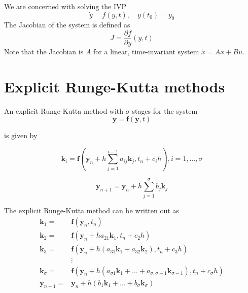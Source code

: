 We are concerned with solving the IVP
\begin{equation}
    \Dot{y} = f(y,t), \quad y(t_0) = y_0
\end{equation}
The Jacobian of the system is defined as
\begin{equation}
    J = \frac{\partial f}{\partial y}(y,t)
\end{equation}
Note that the Jacobian is $A$ for a linear, time-invariant system $\dot{x} = Ax + Bu$.

\section{Explicit Runge-Kutta methods}

An explicit Runge-Kutta method with $σ$ stages for the system
\begin{equation}
    \dot{\mathbf{y}}=\mathbf{f}(\mathbf{y}, t)
\end{equation}

is given by

\begin{equation}
    \mathbf{k}_{i}=\mathbf{f}\left(\mathbf{y}_{n}+h \sum_{j=1}^{i-1} a_{i j} \mathbf{k}_{j}, t_{n}+c_{i} h\right), i=1, \ldots, \sigma
\end{equation}

\begin{equation}
\mathbf{y}_{n+1}=\mathbf{y}_{n}+h \sum_{j=1}^{\sigma} b_{j} \mathbf{k}_{j}
\end{equation}

The explicit Runge-Kutta method can be written out as
\begin{equation}
    \begin{aligned}
        \mathbf{k}_{1}=& \mathbf{f}\left(\mathbf{y}_{n}, t_{n}\right) \\
        \mathbf{k}_{2}=& \mathbf{f}\left(\mathbf{y}_{n}+h a_{21} \mathbf{k}_{1}, t_{n}+c_{2} h\right) \\
        \mathbf{k}_{3}=& \mathbf{f}\left(\mathbf{y}_{n}+h\left(a_{31} \mathbf{k}_{1}+a_{32} \mathbf{k}_{2}\right), t_{n}+c_{3} h\right) \\
        & \vdots \\
        \mathbf{k}_{\sigma}=& \mathbf{f}\left(\mathbf{y}_{n}+h\left(a_{\sigma 1} \mathbf{k}_{1}+\ldots+a_{\sigma, \sigma-1} \mathbf{k}_{\sigma-1}\right), t_{n}+c_{\sigma} h\right) \\
        \mathbf{y}_{n+1}=& \mathbf{y}_{n}+h\left(b_{1} \mathbf{k}_{1}+\ldots+b_{\sigma} \mathbf{k}_{\sigma}\right)
    \end{aligned}
\end{equation}

